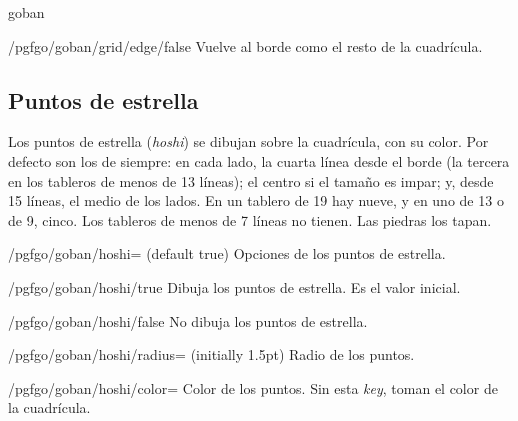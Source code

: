 \begin{environment}{{goban}}
	\begin{stylekey}{/pgfgo/goban/grid/edge/false}
		Vuelve al borde como el resto de la cuadrícula.
	\end{stylekey}

	\subsection{Puntos de estrella}
	\label{subsec:hoshi}

	Los puntos de estrella (\emph{hoshi}) se dibujan sobre la cuadrícula, con su color. Por defecto son los de siempre: en cada lado, la cuarta línea desde el borde (la tercera en los tableros de menos de 13 líneas); el centro si el tamaño es impar; y, desde 15 líneas, el medio de los lados. En un tablero de 19 hay nueve, y en uno de 13 o de 9, cinco. Los tableros de menos de 7 líneas no tienen. Las piedras los tapan.

	\begin{key}{/pgfgo/goban/hoshi= (default true)}
		Opciones de los puntos de estrella.

		\begin{codeexample}[]
			\begin{goban}[9]
			\end{goban}

			\begin{goban}[9, hoshi = false]
			\end{goban}
		\end{codeexample}
	\end{key}

	\begin{stylekey}{/pgfgo/goban/hoshi/true}
		Dibuja los puntos de estrella. Es el valor inicial.
	\end{stylekey}

	\begin{stylekey}{/pgfgo/goban/hoshi/false}
		No dibuja los puntos de estrella.
	\end{stylekey}

	\begin{key}{/pgfgo/goban/hoshi/radius= (initially 1.5pt)}
		Radio de los puntos.
	\end{key}

	\begin{key}{/pgfgo/goban/hoshi/color=}
		Color de los puntos. Sin esta \emph{key}, toman el color de la cuadrícula.

		\begin{codeexample}[]
			\begin{goban}[9, hoshi = {radius = 2.5pt, color = red}]
			\end{goban}
		\end{codeexample}
	\end{key}


\end{environment}
